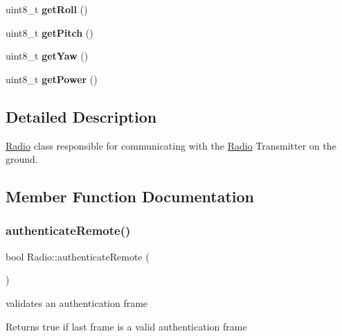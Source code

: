 \begin{DoxyCompactItemize}
uint8\+\_\+t {\bfseries get\+Roll} ()
\item 
\mbox{\label{class_radio_a497f8533da9df3d64ca8bbe5ddb6477c}} 
uint8\+\_\+t {\bfseries get\+Pitch} ()
\item 
\mbox{\label{class_radio_ab5828ab85c10d920c650a44b78225563}} 
uint8\+\_\+t {\bfseries get\+Yaw} ()
\item 
\mbox{\label{class_radio_a4060add1b24bc065f05abd969acc5573}} 
uint8\+\_\+t {\bfseries get\+Power} ()
\end{DoxyCompactItemize}


\subsection{Detailed Description}
\hyperlink{class_radio}{Radio} class responsible for communicating with the \hyperlink{class_radio}{Radio} Transmitter on the ground. 

\subsection{Member Function Documentation}
\mbox{\label{class_radio_a50a86b8fbc5cd906c721d54406f98b9b}} 
\subsubsection{\texorpdfstring{authenticate\+Remote()}{authenticateRemote()}}
{\footnotesize\ttfamily bool Radio\+::authenticate\+Remote (\begin{DoxyParamCaption}{ }\end{DoxyParamCaption})}



validates an authentication frame 

\begin{DoxyReturn}{Returns}
true if last frame is a valid authentication frame 
\end{DoxyReturn}
\mbox{\label{class_radio_acb313b8c4ccfbe9eed993d566e563f89}} 
